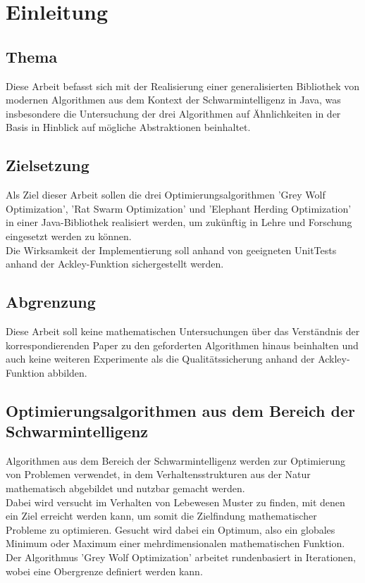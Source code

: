\chapter{Einleitung}

\section{Thema}
Diese Arbeit befasst sich mit der Realisierung einer generalisierten Bibliothek von modernen Algorithmen aus dem Kontext der Schwarmintelligenz in Java, was insbesondere die Untersuchung der drei Algorithmen auf Ähnlichkeiten in der Basis in Hinblick auf mögliche Abstraktionen beinhaltet. 

\section{Zielsetzung}
Als Ziel dieser Arbeit sollen die drei Optimierungsalgorithmen 'Grey Wolf Optimization', 'Rat Swarm Optimization' und 'Elephant Herding Optimization' in einer Java-Bibliothek realisiert werden, um zukünftig in Lehre und Forschung eingesetzt werden zu können.\\
Die Wirksamkeit der Implementierung soll anhand von geeigneten UnitTests anhand der Ackley-Funktion sichergestellt werden.

\section{Abgrenzung}
Diese Arbeit soll keine mathematischen Untersuchungen über das Verständnis der korrespondierenden Paper zu den geforderten Algorithmen hinaus beinhalten und auch keine weiteren Experimente als die Qualitätssicherung anhand der Ackley-Funktion abbilden.

\section{Optimierungsalgorithmen aus dem Bereich der Schwarmintelligenz}
Algorithmen aus dem Bereich der Schwarmintelligenz werden zur Optimierung von Problemen verwendet, in dem Verhaltensstrukturen aus der Natur mathematisch abgebildet und nutzbar gemacht werden.\\
Dabei wird versucht im Verhalten von Lebewesen Muster zu finden, mit denen ein Ziel erreicht werden kann, um somit die Zielfindung mathematischer Probleme zu optimieren. Gesucht wird dabei ein Optimum, also ein globales Minimum oder Maximum einer mehrdimensionalen mathematischen Funktion.\\
Der Algorithmus 'Grey Wolf Optimization' arbeitet rundenbasiert in Iterationen, wobei eine Obergrenze definiert werden kann.

